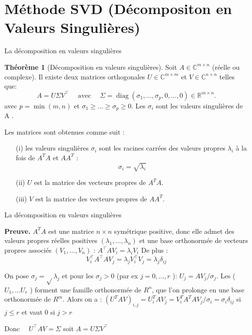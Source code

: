 \documentclass[french, 10pt]{beamer}
\theoremstyle{definition}
\newtheorem{theoreme}{Théorème}
\begin{document}
\section{Méthode SVD (Décompositon en Valeurs Singulières)}
\begin{frame}{La décomposition en valeurs singulières \cite{perrier2011} \cite{quarteroni2010}}
	\begin{theoreme}[Décomposition en valeurs singulières] Soit $A \in \mathbb{C}^{m \times n}$ (réelle ou complexe). Il existe deux matrices orthogonales $U \in \mathbb{C}^{m \times m}$ et $V \in \mathbb{C}^{n \times n}$ telles que:
		$$
		A=U \Sigma V^{\top} \quad \text { avec } \quad \Sigma=\operatorname{diag} (\sigma_1, \ldots,\sigma_p, 0, \ldots, 0 ) \in \mathbb{R}^{m \times n}.
		$$
		avec $p=\min (m, n)$ et $\sigma_1 \geq \ldots \geq \sigma_p \geq 0$.
		Les $\sigma_i$ sont les valeurs singulières de A .
		
		Les matrices sont obtenues comme suit :
		\begin{itemize}
			\item[(i)] les valeurs singulières $\sigma_i$ sont les racines carrées des valeurs propres $\lambda_i$ à la fois de $A^T A$ et $A A^T$ : \[\sigma_i = \sqrt{\lambda_i} \]
			\item[(ii)] $U$ est la matrice des vecteurs propres de $A^T A$.
			\item[(iii)] $V$ est la matrice des vecteurs propres de $A A^T$.
		\end{itemize}
	\end{theoreme}
\end{frame}
\begin{frame}{La décomposition en valeurs singulières}
	
	\textbf{Preuve.}
	$A^T A$ est une matrice $n \times n$ symétrique positive, donc elle admet des valeurs propres réelles positives $(\lambda_1, \ldots, \lambda_n)$ et une base orthonormée de vecteurs propres associés $\left(V_1, \ldots, V_n\right)$ : $A^{\top} A V_i=\lambda_i V_i$
	De plus :
	$$
	V_i^{\top} A^{\top} A V_j=\lambda_j V_i^{\top} V_j=\lambda_j \delta_{i j}
	$$
	
	On pose $\sigma_j=\sqrt{ } \lambda_j$ et pour les $\sigma_j>0$ (par ex $j=0, \ldots, r$ ): $U_j=A V_j / \sigma_j$.
	Les ( $U_1, \ldots U_r$ ) forment une famille orthonormée de $R^n$, que l'on prolonge en une base orthonormée de $R^m$. Alors on a :
	$\left(U^T A V\right)_{i, j}=U_i^T A V_j=V_i^T A^T A V_j / \sigma_i=\sigma_i \delta_{i j}$ si $j \leq r$ et vaut 0 si $j>r$
	
	Donc $\quad U^{\top} A V=\Sigma$ soit $A=U \Sigma V^{\top}$
	
\end{frame}
\end{document}
